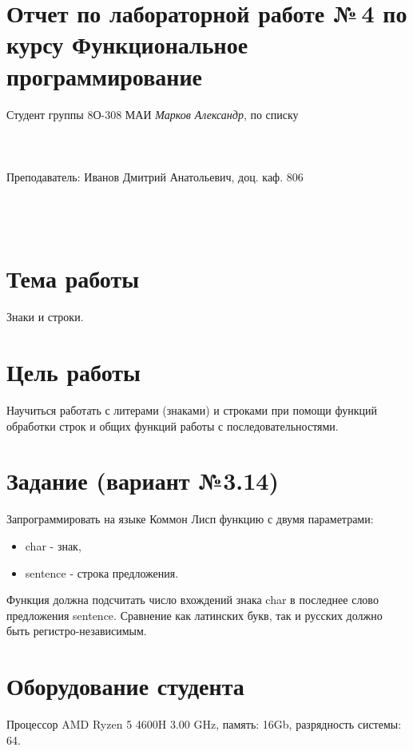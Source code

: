 \documentclass[12pt]{article}
\begin{document}
\section*{Отчет по лабораторной работе №\,4 
по курсу \guillemotleft  Функциональное программирование\guillemotright}
\begin{flushright}
Студент группы 8О-308 МАИ \textit{Марков Александр},  по списку \\
 \\
 \\
\ \\
Преподаватель: Иванов Дмитрий Анатольевич, доц. каф. 806 \\
 \\
 \\
 \\

\end{flushright}

\section{Тема работы}
Знаки и строки.

\section{Цель работы}
Научиться работать с литерами (знаками) и строками при помощи функций обработки строк и общих функций работы с последовательностями.

\section{Задание (вариант №3.14)}
Запрограммировать на языке Коммон Лисп функцию с двумя параметрами:

\begin{itemize}
    \item char - знак,
    \item sentence - строка предложения.
\end{itemize}

Функция должна подсчитать число вхождений знака char в последнее слово предложения sentence. Сравнение как латинских букв, так и русских должно быть регистро-независимым.

\section{Оборудование студента}
Процессор AMD Ryzen 5 4600H 3.00 GHz, память: 16Gb, разрядность системы: 64.
\end{document}
